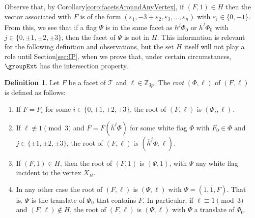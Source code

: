 \documentclass[final]{amsart}
\theoremstyle{plain}
\theoremstyle{definition}
\newtheorem{defn}[thm]{Definition}
\theoremstyle{remark}
\numberwithin{equation}{section}
\renewcommand{\epsilon}{\varepsilon} \renewcommand{\subset}{\subseteq} \renewcommand{\supset}{\supseteq} \renewcommand{\subsetneq}{\varsubsetneq}
\renewcommand{\{}{\lbrace}
\renewcommand{\}}{\rbrace}
\renewcommand{\bar}{\overline}
\newcommand{\bZ}{\mathbb{Z}}
\newcommand{\cT}{\mathcal{T}}
\newcommand{\vect}[1]{\bar{\mathrm{#1}}}
\newcommand{\kng}{{h}}
\newcommand{\etab}{\bar{\kng}}
\begin{document}
Observe that, by Corollary\nobreakspace \ref {coro:facetsAroundAnyVertex},  if $(F,1) \in H$ then the vector associated with $F$  is of the form $(\epsilon_1,-3 +\epsilon_2, \epsilon_3, \ldots,\epsilon_{n})$ with $\epsilon_i \in \{0,-1\}$. 
From this, we see that if a flag $\Psi$ is in the same facet as $\kng^j\Phi_0$ or $\etab^j\Phi_0$ with $j \in \{0, \pm 1,\pm 2, \pm 3\}$, then the facet of $\Psi$ is not in $H$. This information is relevant for the following definition and observations, but the set $H$ itself will not play a role until Section\nobreakspace \ref {sec:IP}, when we prove that, under certain circumstances, $\groupExt$  has the intersection property.

\begin{defn}\label{defn:baseFlags}
Let $F$ be a facet of $\cT$ and $\ell \in \bZ_{3p}$. 
The \emph{root} $(\Phi,\ell)$ of $(F,\ell)$ is defined as follows:
\begin{enumerate}
    \item \label{item:WhiteBase} If $F = F_i$ for some $i \in \{0,\pm1,\pm2,\pm3\}$, the root of $(F,\ell)$ is $(\Phi_{i}, \ell)$. 
    \item \label{item:BlackBase} If $\ell \not\equiv 1 \pmod{3}$ and $F=F(\etab^{j}\Phi)$ for some white flag $\Phi$ with $F_{0}\in \Phi$ and $j \in \{\pm1,\pm2,\pm3\}$, the root of $\left( F,\ell \right)$  is $(\etab^{j}\Phi,\ell)$.
    \item \label{item:rootsH} If $(F,1) \in H$, then the root of $(F,1)$ is $(\Psi,1)$, with $\Psi$ any white flag incident to the vertex $X_H$.
    \item \label{item:OthersBase} In any other case the root of $(F,\ell)$ is $(\Psi, \ell)$ with $\Psi = (1, \vect{1}, F)$. That is, $\Psi$ is the translate of $\Phi_{0}$ that contains $F$.
    In particular, if  $\ell \equiv 1 \pmod{3}$ and $(F,\ell) \not\in H$, the root of $(F,\ell)$ is $(\Psi, \ell)$ with $\Psi$ a translate of $\Phi_{0}$.
    \end{enumerate}
\end{defn}
\end{document}
